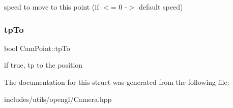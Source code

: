 speed to move to this point (if $<$= 0 -\/$>$ default speed) \mbox{\label{struct_cam_point_a1a53e869d446d6335370ff477f3776ae}} 
\subsubsection{\texorpdfstring{tp\+To}{tpTo}}
{\footnotesize\ttfamily bool Cam\+Point\+::tp\+To}

if true, tp to the position 

The documentation for this struct was generated from the following file\+:\begin{DoxyCompactItemize}
\item 
includes/utils/opengl/Camera.\+hpp\end{DoxyCompactItemize}
